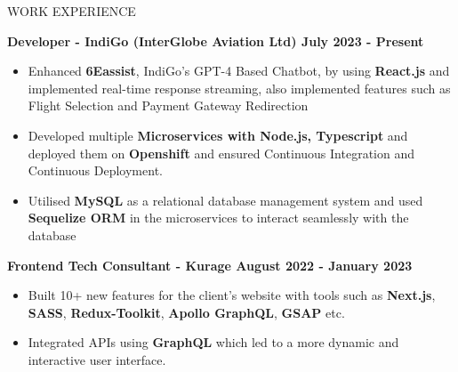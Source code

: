 \documentclass{resume} %
\begin{document}







\begin{rSection}{WORK EXPERIENCE}

{\bf Developer - IndiGo (InterGlobe Aviation Ltd)  \hfill July 2023 - Present }
\begin{itemize}
    \item {\normalfont Enhanced \textbf{6Eassist}, IndiGo's GPT-4 Based Chatbot, by using \textbf{React.js} and implemented real-time response streaming, also implemented features such as Flight Selection and Payment Gateway Redirection}
    \item {\normalfont Developed multiple \textbf{Microservices with Node.js, Typescript} and deployed them on \textbf{Openshift} and ensured Continuous Integration and Continuous Deployment.}
    \item {\normalfont Utilised \textbf{MySQL} as a relational database management system and used \textbf{Sequelize ORM} in the microservices to interact seamlessly with the database}
    
   
 
\end{itemize}


{\bf Frontend Tech Consultant - Kurage  \hfill August 2022 - January 2023 }
\begin{itemize}

    \item {\normalfont  Built 10+ new features for the client's website with tools such as \textbf{{Next.js}}, \textbf{{SASS}}, \textbf{{Redux-Toolkit}}, \textbf{{Apollo GraphQL}}, \textbf{{GSAP}} etc. }
   \item {\normalfont Integrated APIs using \textbf{{GraphQL}} which led to a more dynamic and interactive user interface.} 
 
\end{itemize}

\end{rSection}


\end{document}
